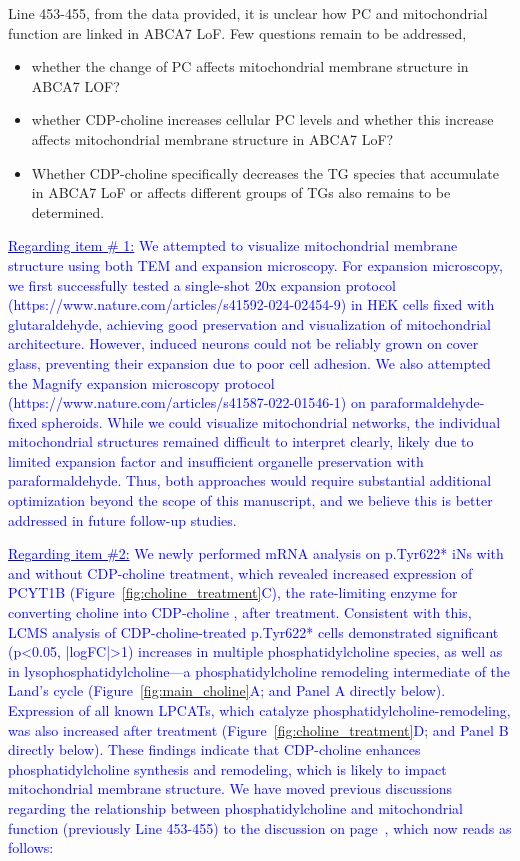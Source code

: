 Line 453-455, from the data provided, it is unclear how PC and mitochondrial function are linked in ABCA7 LoF. Few questions remain to be addressed,
\begin{itemize}
	\item whether the change of PC affects mitochondrial membrane structure in ABCA7 LOF?

	\item whether CDP-choline increases cellular PC levels and whether this increase affects mitochondrial membrane structure in ABCA7 LoF?
	
	\item Whether CDP-choline specifically decreases the TG species that accumulate in ABCA7 LoF or affects different groups of TGs also remains to be determined.
\end{itemize}

\textcolor{blue}{\underline{Regarding item \# 1:} We attempted to visualize mitochondrial membrane structure using both TEM and expansion microscopy. For expansion microscopy, we first successfully tested a single-shot 20x expansion protocol (https://www.nature.com/articles/s41592-024-02454-9) in HEK cells fixed with glutaraldehyde, achieving good preservation and visualization of mitochondrial architecture. However, induced neurons could not be reliably grown on cover glass, preventing their expansion due to poor cell adhesion. We also attempted the Magnify expansion microscopy protocol (https://www.nature.com/articles/s41587-022-01546-1) on paraformaldehyde-fixed spheroids. While we could visualize mitochondrial networks, the individual mitochondrial structures remained difficult to interpret clearly, likely due to limited expansion factor and insufficient organelle preservation with paraformaldehyde. Thus, both approaches would require substantial additional optimization beyond the scope of this manuscript, and we believe this is better addressed in future follow-up studies.}

\textcolor{blue}{\underline{Regarding item \#2:} We newly performed mRNA analysis on p.Tyr622* iNs with and without CDP-choline treatment, which revealed increased expression of PCYT1B (Figure~\ref{fig:choline_treatment}C), the rate-limiting enzyme for converting choline into CDP-choline \cite{Lykidis1998-rj}, after treatment. Consistent with this, LCMS analysis of CDP-choline-treated p.Tyr622* cells demonstrated significant (p<0.05, |logFC|>1) increases in multiple phosphatidylcholine species, as well as in lysophosphatidylcholine—a phosphatidylcholine remodeling intermediate of the Land’s cycle (Figure~\ref{fig:main_choline}A; and Panel A directly below). Expression of all known LPCATs, which catalyze phosphatidylcholine-remodeling, was also increased  after treatment (Figure~\ref{fig:choline_treatment}D; and Panel B directly below). These findings indicate that CDP-choline enhances phosphatidylcholine synthesis and remodeling, which is likely to impact mitochondrial membrane structure. We have moved previous discussions regarding the relationship between phosphatidylcholine and mitochondrial function (previously Line 453-455) to the discussion on page~\pageref{quoteI-label}, which now reads as follows:}

